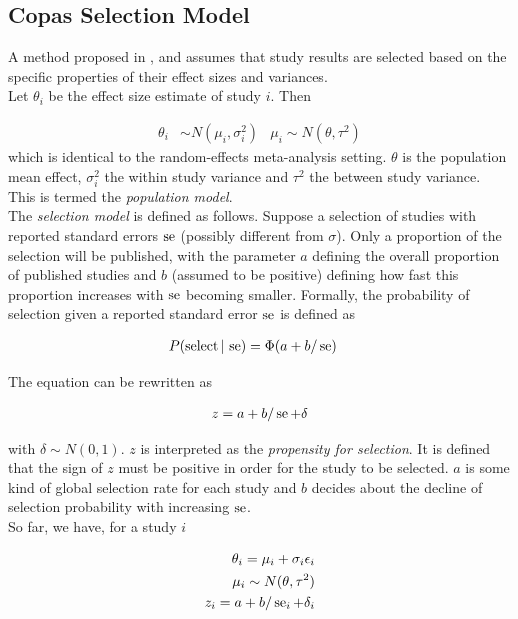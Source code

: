 \documentclass[11pt,a4paper,twoside]{book}\usepackage[]{graphicx}\usepackage[]{color}
\begin{document}
\subsection{Copas Selection Model} \label{sec:copas}

A method proposed in \citet{Copas1}, \citet{Copas2} and \citet{Copas3} assumes that study results are selected based on the specific properties of their effect sizes and variances. \\
Let $\theta_i$ be the effect size estimate of study $i$. Then 

\begin{align}
\theta_i &\sim N(\mu_i, \sigma_i^2) &
\mu_i \sim N(\theta, \tau^2) \label{eq:population.model}
\end{align}
which is identical to the random-effects meta-analysis setting. $\theta$ is the population mean effect, $\sigma_i^2$ the within study variance and $\tau^2$ the between study variance. This is termed the \textit{population model}. \\
The \textit{selection model} is defined as follows. Suppose a selection of studies with reported %
standard errors $\operatorname{se}$ (possibly different from $\sigma$). Only a proportion of the selection will be published, with the parameter $a$ defining the overall proportion of published studies and $b$ (assumed to be positive) defining how fast this proportion increases with $\operatorname{se}$ becoming smaller. Formally, the probability of selection given a reported standard error $\operatorname{se}$ is defined as

\begin{align}
P(\textrm{select}\given \se) &= \Phi(a + b/\se) \nonumber %
\end{align}

The equation can be rewritten as 

\begin{align}
z = a + b/\se + \delta \nonumber %
\end{align}

with $\delta \sim N(0,1)$. $z$ is interpreted as the \textit{propensity for selection}. It is defined that the sign of $z$ must be positive in order for the study to be selected.
$a$ is some kind of global selection rate for each study and $b$ decides about the decline of selection probability with increasing $\operatorname{se}$.\\
So far, we have, for a study $i$

\begin{align}
\theta_i = \mu_i + \sigma_i\epsilon_i \nonumber \\ 
\mu_i \sim N(\theta, \tau^2) \nonumber \\
z_i = a + b/\operatorname{se}_i + \delta_i \nonumber
\end{align}
\end{document}
